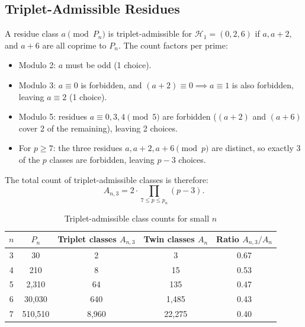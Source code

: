\documentclass[11pt]{article}
\begin{document}
\subsection{Triplet-Admissible Residues}

A residue class $a \pmod{P_n}$ is triplet-admissible for $\mathcal{H}_1 = (0, 2, 6)$ if $a, a+2,$ and $a+6$ are all coprime to $P_n$. The count factors per prime:
\begin{itemize}
  \item Modulo 2: $a$ must be odd (1 choice).
  \item Modulo 3: $a \equiv 0$ is forbidden, and $(a+2) \equiv 0 \implies a \equiv 1$ is also forbidden, leaving $a \equiv 2$ (1 choice).
  \item Modulo 5: residues $a \equiv 0, 3, 4 \pmod 5$ are forbidden ($(a+2)$ and $(a+6)$ cover 2 of the remaining), leaving 2 choices.
  \item For $p \geq 7$: the three residues $a, a+2, a+6 \pmod p$ are distinct, so exactly 3 of the $p$ classes are forbidden, leaving $p-3$ choices.
\end{itemize}
The total count of triplet-admissible classes is therefore:
\begin{equation}
    A_{n,3} = 2 \cdot \prod_{7 \le p \le p_n} (p-3).
\end{equation}

\begin{table}[h]
\centering
\caption{Triplet-admissible class counts for small $n$}
\label{tab:triplet_counts}
\begin{tabular}{ccccc}
\toprule
$n$ & $P_n$ & Triplet classes $A_{n,3}$ & Twin classes $A_n$ & Ratio $A_{n,3}/A_n$ \\
\midrule
3 & 30 & 2 & 3 & 0.67 \\
4 & 210 & 8 & 15 & 0.53 \\
5 & 2{,}310 & 64 & 135 & 0.47 \\
6 & 30{,}030 & 640 & 1{,}485 & 0.43 \\
7 & 510{,}510 & 8{,}960 & 22{,}275 & 0.40 \\
\bottomrule
\end{tabular}

\vspace{0.5em}
\end{table}
\end{document}

